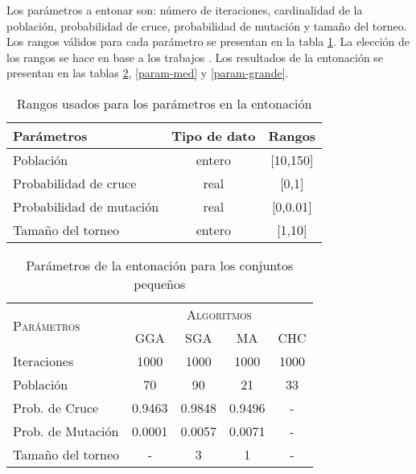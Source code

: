 Los parámetros a entonar son: número de iteraciones, cardinalidad de la población, probabilidad de cruce, probabilidad de mutación y tamaño del torneo. Los rangos válidos para cada parámetro se presentan en la tabla \ref{rangos}. La elección de los rangos se hace en base a los trabajos \cite{de2004reduccion,de2004reduccion,garcia2012prototype,garcia2008memetic,talbi2009metaheuristics}. Los resultados de la entonación se presentan en las tablas \ref{param-peq}, \ref{param-med} y \ref{param-grande}.

\begin{table}[]
\centering
\begin{tabular}{l c c}
\hline
Parámetros & Tipo de dato & Rangos \\
\hline
\hline

Población                & entero           &  [10,150]       \\
Probabilidad de cruce    & real             &  [0,1]          \\
Probabilidad de mutación & real             &  [0,0.01]      \\
Tamaño del torneo        & entero           &  [1,10]         \\  

\hline
\end{tabular}
\caption{Rangos usados para los parámetros en la entonación}
\label{rangos}
\end{table}

\begin{table}[]
\centering
\begin{tabular}{l c c c c}
\hline
\multirow{2}{*}{\textsc{Parámetros}}
	& \multicolumn{4}{c}{\textsc{Algoritmos}} \\
	& GGA & SGA & MA & CHC \\
\hline
\hline
Iteraciones             &  1000    &  1000    &  1000      &  1000 \\
Población               &    70    &    90    &    21      &    33 \\
Prob. de Cruce          &   0.9463 &   0.9848 &     0.9496 &     - \\
Prob. de Mutación       &   0.0001 &  0.0057  &     0.0071 &     - \\
Tamaño del torneo       &   -      &    3     &     1      &     - \\
\hline
\end{tabular}
\caption{Parámetros de la entonación para los conjuntos pequeños}
\label{param-peq}
\end{table}


